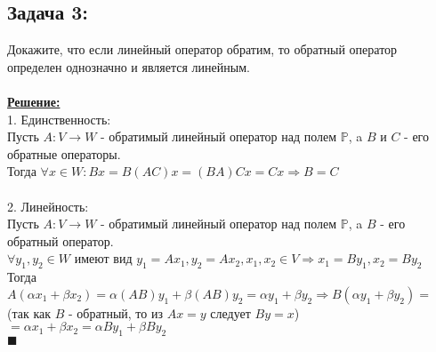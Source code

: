 \documentclass[a4paper,12pt,titlepage,final]{article}
\begin{document}
\subsection*{Задача 3:}
\noindent Докажите, что если линейный оператор обратим, то обратный оператор определен однозначно и является линейным. \\ \\
\textbf{\underline{Решение:}} \\
1. Единственность: \\
Пусть $A: V \rightarrow W$ - обратимый линейный оператор над полем $\mathbb{P}$, a $B$ и $C$ - его обратные операторы.\\
Тогда $\forall x \in W: Bx = B(AC)x = (BA)Cx = Cx \Rightarrow B = C$ \\ \\
2. Линейность: \\
Пусть $A: V \rightarrow W$ - обратимый линейный оператор над полем $\mathbb{P}$, a $B$ - его обратный оператор.\\
$\forall y_1, y_2 \in W$ имеют вид $ y_1 = Ax_1, y_2 = Ax_2, x_1, x_2 \in V \Rightarrow x_1 = By_1, x_2 = By_2$ \\
Тогда $A(\alpha x_1 + \beta x_2) = \alpha (AB)y_1 + \beta (AB)y_2 = \alpha y_1 + \beta y_2 \Rightarrow B(\alpha y_1 + \beta y_2) =$
(так как $B$ - обратный, то из $Ax = y$ следует $By = x$) $= \alpha x_1 + \beta x_2 = \alpha By_1 + \beta By_2$ \\ $\blacksquare$ \\ \\ \\


\end{document}
